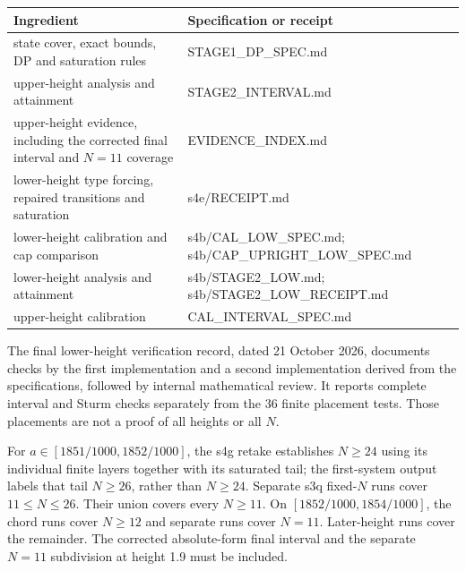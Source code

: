 \documentclass[
  11pt,
  a4paper,
]{article}
\newcounter{none} %
\begin{document}
{\def\LTcaptype{none} %
\begin{longtable}[]{@{}
  >{\raggedright\arraybackslash}p{}
  >{\raggedright\arraybackslash}p{}@{}}
\toprule\noalign{}
\begin{minipage}[b]{\linewidth}\raggedright
Ingredient
\end{minipage} & \begin{minipage}[b]{\linewidth}\raggedright
Specification or receipt
\end{minipage} \\
\midrule\noalign{}
\endhead
\bottomrule\noalign{}
\endlastfoot
state cover, exact bounds, DP and saturation rules &
STAGE1\_DP\_SPEC.md \\
upper-height analysis and attainment & STAGE2\_INTERVAL.md \\
upper-height evidence, including the corrected final interval and
\(N=11\) coverage & EVIDENCE\_INDEX.md \\
lower-height type forcing, repaired transitions and saturation &
s4e/RECEIPT.md \\
lower-height calibration and cap comparison & s4b/CAL\_LOW\_SPEC.md;
s4b/CAP\_UPRIGHT\_LOW\_SPEC.md \\
lower-height analysis and attainment & s4b/STAGE2\_LOW.md;
s4b/STAGE2\_LOW\_RECEIPT.md \\
upper-height calibration & CAL\_INTERVAL\_SPEC.md \\
\end{longtable}
}

The final lower-height verification record, dated 21 October 2026,
documents checks by the first implementation and a second implementation
derived from the specifications, followed by internal mathematical
review. It reports complete interval and Sturm checks separately from
the 36 finite placement tests. Those placements are not a proof of all
heights or all \(N\).

For \(a\in[1851/1000,1852/1000]\), the s4g retake establishes \(N\ge24\)
using its individual finite layers together with its saturated tail; the
first-system output labels that tail \(N\ge26\), rather than \(N\ge24\).
Separate s3q fixed-\(N\) runs cover \(11\le N\le26\). Their union covers
every \(N\ge11\). On \([1852/1000,1854/1000]\), the chord runs cover
\(N\ge12\) and separate runs cover \(N=11\). Later-height runs cover the
remainder. The corrected absolute-form final interval and the separate
\(N=11\) subdivision at height 1.9 must be included.
\end{document}
